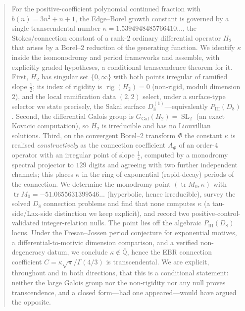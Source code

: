 \documentclass[11pt,reqno]{amsart}
\theoremstyle{plain}
\theoremstyle{definition}
\theoremstyle{remark}
\newcommand{\Q}{\mathbb{Q}}
\newcommand{\Qbar}{\overline{\Q}}
\newcommand{\GGal}{G_{\mathrm{Gal}}}
\newcommand{\SL}{\operatorname{SL}}
\newcommand{\tr}{\operatorname{tr}}
\DeclareMathOperator{\rig}{rig}
\newcommand{\Htwo}{H_{2}}
\newcommand{\PIII}{P_{\mathrm{III}}}
\begin{document}
\begin{abstract}
For the positive-coefficient polynomial continued fraction with
$b(n)=3n^{2}+n+1$, the Edge--Borel growth constant is governed by a single
transcendental number $\kappa=1.5394948485766410\ldots$, the Stokes/connection
constant of a rank-$2$ ordinary differential operator $\Htwo$ that arises by a
Borel--$2$ reduction of the generating function. We identify $\kappa$ inside the
isomonodromy and period frameworks and assemble, with explicitly graded
hypotheses, a conditional transcendence theorem for it. First, $\Htwo$ has
singular set $\{0,\infty\}$ with both points irregular of ramified slope
$\tfrac12$; its index of rigidity is $\rig(\Htwo)=0$ (non-rigid, moduli
dimension $2$), and the local ramification data $(2,2)$ select, under a
surface-type selector we state precisely, the Sakai surface
$D_{8}^{(1)}$---equivalently $\PIII(D_{8})$. Second, the differential Galois
group is $\GGal(\Htwo)=\SL_{2}$ (an exact Kovacic computation), so $\Htwo$ is
irreducible and has no Liouvillian solutions. Third, on the convergent
Borel--$2$ transform $\Phi$ the constant $\kappa$ is realised \emph{constructively}
as the connection coefficient $A_{\Phi}$ of an order-$4$ operator with an
irregular point of slope $\tfrac14$, computed by a monodromy spectral projector
to $129$ digits and agreeing with two further independent channels; this places
$\kappa$ in the ring of exponential (rapid-decay) periods of the connection. We
determine the monodromy point $(\tr M_{0},\kappa)$ with
$\tr M_{0}=-51.0655631399546\ldots$ (hyperbolic, hence irreducible), survey the
solved $D_{8}$ connection problems and find that none computes $\kappa$ (a
tau-side/Lax-side distinction we keep explicit), and record two
positive-control-validated integer-relation nulls. The point lies off the
algebraic $\PIII(D_{8})$ locus. Under the Fresan--Jossen period conjecture for
exponential motives, a differential-to-motivic dimension comparison, and a
verified non-degeneracy datum, we conclude $\kappa\notin\Qbar$, hence the
EBR connection coefficient $C=\kappa\sqrt{\pi}/\Gamma(4/3)$ is transcendental.
We are explicit, throughout and in both directions, that this is a conditional
statement: neither the large Galois group nor the non-rigidity nor any null
proves transcendence, and a closed form---had one appeared---would have argued
the opposite.
\end{abstract}

\maketitle
\end{document}
